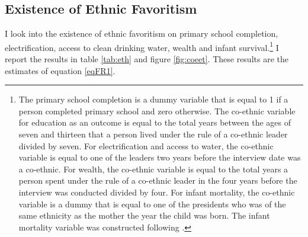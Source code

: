 \documentclass{wptemp}
\begin{document}
\subsection{Existence of Ethnic Favoritism} \label{subsec1}
I look into the existence of ethnic favoritism on primary school completion, electrification, access to clean drinking water, wealth and infant survival.\footnote{The primary school completion is a dummy variable that is equal to 1 if a person completed primary school and zero otherwise. The co-ethnic variable for education as an outcome is equal to the total years between the ages of seven and thirteen that a person lived under the rule of a co-ethnic leader divided by seven. For electrification and access to water, the co-ethnic variable is equal to one of the leaders two years before the interview date was a co-ethnic. For wealth, the co-ethnic variable is equal to the total years a person spent under the rule of a co-ethnic leader in the four years before the interview was conducted divided by four. For infant mortality, the co-ethnic variable is a dummy that is equal to one of the presidents who was of the same ethnicity as the mother the year the child was born. The infant mortality variable was constructed following \citet{kudamatsu2009ethnic, kudamatsu2012has}.} I report the results in table \ref{tab:eth} and figure \ref{fig:coeet}. These results are the estimates of equation \ref{eqFR1}. 


\end{document}
